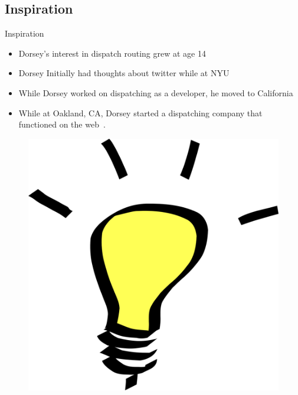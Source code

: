 \documentclass[xcolor=svgnames,handout]{beamer}
\begin{document}
\subsection{Inspiration}

\begin{frame}
{Inspiration}
  \begin{itemize}
      \item{Dorsey's interest in dispatch routing grew at age 14~\cite{markglaser2007}}
      \item{Dorsey Initially had thoughts about twitter while at NYU~\cite{unkown2009}}
      \item{While Dorsey worked on dispatching as a developer, he moved to California~\cite{businessweek2008}~\cite{jackdorsey2009}}
      \item While at Oakland, CA, Dorsey started a dispatching company that functioned on the web~\cite{jackdorsey2006}.
  \end{itemize}
	\begin{figure}[h]
		\centering
		\includegraphics[scale=0.15]{lightbulb.png}
		\caption{\cite{anonymous2014}}
	\end{figure}
\end{frame}
\end{document}
